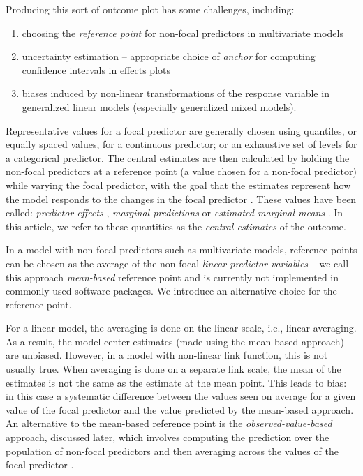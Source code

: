 Producing this sort of outcome plot has some challenges, including:
\begin{enumerate}
\item choosing the \emph{reference point} for non-focal predictors in multivariate models
\item uncertainty estimation -- appropriate choice of \emph{anchor} for computing confidence intervals in effects plots
\item biases induced by non-linear transformations of the response variable in generalized linear models (especially generalized mixed models).
\end{enumerate}

Representative values for a focal predictor are generally chosen using quantiles, or equally spaced values, for a continuous predictor; or an exhaustive set of levels for a categorical predictor.
The central estimates are then calculated by holding the non-focal predictors at a reference point (a value chosen for a non-focal predictor) while varying the focal predictor, with the goal that the estimates represent how the model responds to the changes in the focal predictor \citep{fox2009effect, hanmer2013behind}. These values have been called: \emph{predictor effects} \citep{fox2009effect}, \emph{marginal predictions} \citep{leeper2017package} or \emph{estimated marginal means} \citep{lenth2018package}. In this article, we refer to these quantities as the \emph{central estimates} of the outcome. 


In a model with non-focal predictors such as multivariate models, reference points can be chosen as the average of the non-focal \emph{linear predictor variables} -- we call this approach \emph{mean-based} reference point and is currently not implemented in commonly used  software packages. We introduce an alternative choice for the reference point.

For a linear model, the averaging is done on the linear scale, i.e., linear averaging. As a result, the model-center estimates (made using the mean-based approach) are unbiased. 
However, in a model with non-linear link function, this is not usually true. When averaging is done on a separate link scale, the mean of the estimates is not the same as the estimate at the mean point. 
This leads to bias: in this case a systematic difference between the values seen on average for a given value of the focal predictor and the value predicted by the mean-based approach. 
An alternative to the mean-based reference point is the \emph{observed-value-based} approach, discussed later, which involves computing the prediction over the population of non-focal predictors and then averaging across the values of the focal predictor \citep{hanmer2013behind}. 

